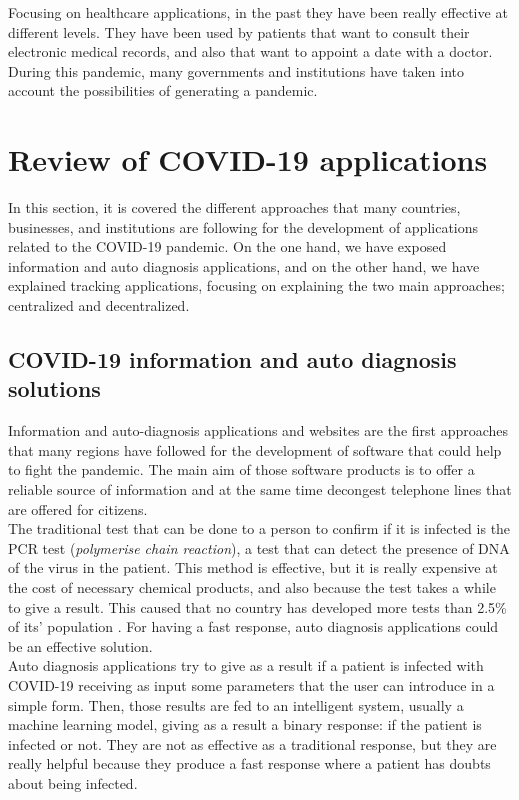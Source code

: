 \documentclass[a4paper, 12pt]{article}
\begin{document}
Focusing on healthcare applications, in the past they have been really effective at different levels. They have been used by patients that want to consult their electronic medical records, and also that want to appoint a date with a doctor. During this pandemic, many governments and institutions have taken into account the possibilities of generating a pandemic.


\section{Review of COVID-19 applications}
\label{section:review}

In this section, it is covered the different approaches that many countries, businesses, and institutions are following for the development of applications related to the COVID-19 pandemic. On the one hand, we have exposed information and auto diagnosis applications, and on the other hand, we have explained tracking applications, focusing on explaining the two main approaches; centralized and decentralized.

\subsection{COVID-19 information and auto diagnosis solutions}
\label{subsection:information-auto-diagnosis}

Information and auto-diagnosis applications and websites are the first approaches that many regions have followed for the development of software that could help to fight the pandemic. The main aim of those software products is to offer a reliable source of information and at the same time decongest telephone lines that are offered for citizens. \\

The traditional test that can be done to a person to confirm if it is infected is the PCR test (\textit{polymerise chain reaction}), a test that can detect the presence of DNA of the virus in the patient. This method is effective, but it is really expensive at the cost of necessary chemical products, and also because the test takes a while to give a result. This caused that no country has developed more tests than 2.5\% of its' population \cite{covid19-ml}. For having a fast response, auto diagnosis applications could be an effective solution.\\

Auto diagnosis applications try to give as a result if a patient is infected with COVID-19 receiving as input some parameters that the user can introduce in a simple form. Then, those results are fed to an intelligent system, usually a machine learning model, giving as a result a binary response: if the patient is infected or not. They are not as effective as a traditional response, but they are really helpful because they produce a fast response where a patient has doubts about being infected.\\
\end{document}
